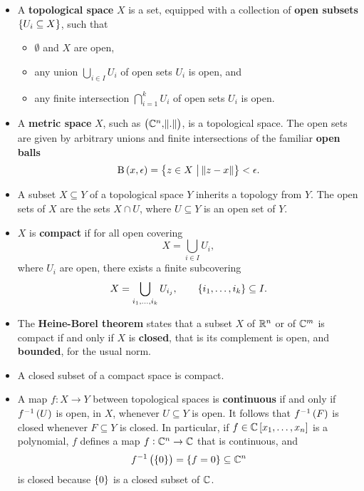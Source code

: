 \begin{remark}
\label{rem:2.19}
\hfill
\begin{itemize}
\item A \textbf{topological space} $ X $ is a set, equipped with a collection of \textbf{open subsets} $ \cbr{U_i \subseteq X} $, such that
\begin{itemize}
\item $ \emptyset $ and $ X $ are open,
\item any union $ \bigcup_{i \in I} U_i $ of open sets $ U_i $ is open, and
\item any finite intersection $ \bigcap_{i = 1}^k U_i $ of open sets $ U_i $ is open.
\end{itemize}
\item A \textbf{metric space} $ X $, such as $ \br{\CC^n, \norm{.}} $, is a topological space. The open sets are given by arbitrary unions and finite intersections of the familiar \textbf{open balls}
$$ \B\br{x, \epsilon} = \cbr{z \in X \st \norm{z - x}} < \epsilon. $$
\item A subset $ X \subseteq Y $ of a topological space $ Y $ inherits a topology from $ Y $. The open sets of $ X $ are the sets $ X \cap U $, where $ U \subseteq Y $ is an open set of $ Y $.
\item $ X $ is \textbf{compact} if for all open covering
$$ X = \bigcup_{i \in I} U_i, $$
where $ U_i $ are open, there exists a finite subcovering
$$ X = \bigcup_{i_1, \dots, i_k} U_{i_j}, \qquad \cbr{i_1, \dots, i_k} \subseteq I. $$
\item The \textbf{Heine-Borel theorem} states that a subset $ X $ of $ \mathbb{R}^n $ or of $ \mathbb{C}^m $ is compact if and only if $ X $ is \textbf{closed}, that is its complement is open, and \textbf{bounded}, for the usual norm.
\item A closed subset of a compact space is compact.
\item A map $ f : X \to Y $ between topological spaces is \textbf{continuous} if and only if $ f^{-1}\br{U} $ is open, in $ X $, whenever $ U \subseteq Y $ is open. It follows that $ f^{-1}\br{F} $ is closed whenever $ F \subseteq Y $ is closed. In particular, if $ f \in \CC\sbr{x_1, \dots, x_n} $ is a polynomial, $ f $ defines a map $ f : \mathbb{C}^n \to \mathbb{C} $ that is continuous, and
$$ f^{-1}\br{\cbr{0}} = \cbr{f = 0} \subseteq \CC^n $$
is closed because $ \cbr{0} $ is a closed subset of $ \mathbb{C} $.
\end{itemize}
\end{remark}

